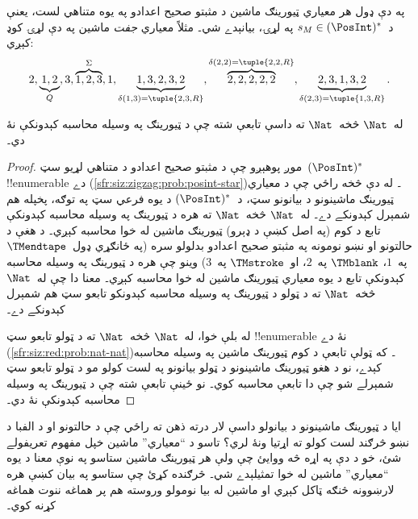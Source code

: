 \documentclass[../../../include/open-logic-section]{subfiles}
\begin{document}
\begin{explain}
په دې ډول هر معياري ټيورينګ ماشين د مثبتو صحيح اعدادو په يوه متناهي
لست، يعنې د~$s_M \in (\PosInt)^*$ په لړۍ، بيانېدے شي۔ مثلاً معياري
\emph{جفت} ماشين په دې لړۍ کوډ کېږي:
\[
2, \underbrace{1, 2}_Q, 3, \overbrace{1, 2, 3}^\Sigma, 1, \underbrace{1, 3, 2, 3, 2}_{\delta(1,3) = \tuple{2,3,R}},
\overbrace{2, 2, 2, 2, 2}^{\delta(2,2) = \tuple{2,2,R}},
\underbrace{2, 3, 1, 3, 2}_{\delta(2,3) = \tuple{1,3,R}}.
\]
\end{explain}

\begin{thm}
له~$\Nat$ څخه~$\Nat$ ته داسې تابعې شته چې د ټيورينګ په وسيله
محاسبه کېدونکې نۀ دي۔
\end{thm}

\begin{proof}
موږ پوهېږو چې د مثبتو صحيح اعدادو د متناهي لړيو سټ~$(\PosInt)^*$
!!{enumerable} دے (\cref{sfr:siz:zigzag:prob:posint-star})۔ له دې څخه
راځي چې د معياري ټيورينګ ماشينونو د بيانونو سټ، د~$(\PosInt)^*$ د
يوه فرعي سټ په توګه، پخپله هم شمېرل کېدونکے دے۔ له~$\Nat$ څخه~$\Nat$
ته هره د ټيورينګ په وسيله محاسبه کېدونکې تابع د کوم (په اصل کښې د
ډېرو) ټيورينګ ماشين له خوا محاسبه کېږي۔ د هغې د حالتونو او نښو نومونه
په مثبتو صحيح اعدادو بدلولو سره (په ځانګړي ډول~$\TMendtape$ په~$1$،
$\TMblank$ په~$2$، او~$\TMstroke$ په~$3$) وينو چې هره د ټيورينګ په
وسيله محاسبه کېدونکې تابع د يوه معياري ټيورينګ ماشين له خوا محاسبه
کېږي۔ معنا دا چې له~$\Nat$ څخه~$\Nat$ ته د ټولو د ټيورينګ په وسيله
محاسبه کېدونکو تابعو سټ هم شمېرل کېدونکے دے۔

له بلې خوا، له~$\Nat$ څخه~$\Nat$ ته د ټولو تابعو سټ !!{enumerable}
نۀ دے (\cref{sfr:siz:red:prob:nat-nat})۔ که ټولې تابعې د کوم ټيورينګ
ماشين په وسيله محاسبه کېدے، نو د هغو ټيورينګ ماشينونو د ټولو بيانونو
په لست کولو مو د ټولو تابعو سټ شمېرلے شو چې دا تابعې محاسبه کوي۔ نو
ځينې تابعې شته چې د ټيورينګ په وسيله محاسبه کېدونکې نۀ دي۔
\end{proof}

\begin{prob}
  ايا د ټيورينګ ماشينونو د بيانولو داسې لار درته ذهن ته راځي چې د
  حالتونو او د الفبا د نښو څرګند لست کولو ته اړتيا ونۀ لري؟ تاسو د
  ``معياري'' ماشين خپل مفهوم تعريفولے شئ، خو د دې په اړه څه ووايئ چې
  ولې هر ټيورينګ ماشين ستاسو په نوې معنا د يوه ``معياري'' ماشين له
  خوا تمثيلېدے شي۔
  څرګنده کړئ چې ستاسو په بيان کښې هره لارښوونه څنګه ټاکل کېږي او
  ماشين له بيا نومولو وروسته هم پر هماغه ننوت هماغه کړنه کوي۔
\end{prob}
\end{document}
